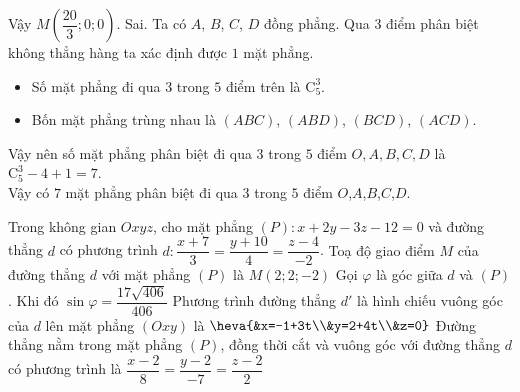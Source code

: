 \begin{ex}
{\begin{itemchoice}
			Vậy $M\left(\dfrac{20}{3};0;0\right)$.
			\itemch Sai. Ta có $A$, $B$, $C$, $D$ đồng phẳng. Qua $3$ điểm phân biệt không thẳng hàng ta xác định được $1$ mặt phẳng.
			\begin{itemize}
				\item Số mặt phẳng đi qua $3$ trong $5$ điểm trên là $\mathrm{C}_5^3$.
				\item Bốn mặt phẳng trùng nhau là $(ABC)$, $(ABD)$, $(BCD)$, $(ACD)$.
			\end{itemize}
			Vậy nên số mặt phẳng phân biệt đi qua $3$ trong $5$ điểm $O,A,B,C,D$ là $\mathrm{C}_5^3-4+1=7$.\\
			Vậy có $7$ mặt phẳng phân biệt đi qua $3$ trong $5$ điểm $O$,$A$,$B$,$C$,$D$.
		\end{itemchoice}
	}
\end{ex}
\begin{ex}%
		Trong không gian $Oxyz$, cho mặt phẳng $(P)\colon x+2y-3z-12=0$ và đường thẳng $d$ có phương trình $d\colon  \dfrac{x+7}{3}=\dfrac{y+10}{4}=\dfrac{z-4}{-2}$.
	\choiceTF
	{\True Toạ độ giao điểm $M$ của đường thẳng $d$ với mặt phẳng $(P)$ là $M(2;2;-2)$}
	{\True Gọi $\varphi $ là góc giữa $d$ và $(P)$. Khi đó $\sin \varphi=\dfrac{17\sqrt{406}}{406}$}
	{Phương trình đường thẳng $d'$ là hình chiếu vuông góc của $d$ lên mặt phẳng $\left(Oxy\right)$ là $\heva{&x=-1+3t\\&y=2+4t\\&z=0}$}
	{Đường thẳng nằm trong mặt phẳng $(P)$, đồng thời cắt và vuông góc với đường thẳng $d$ có phương trình là $\dfrac{x-2}{8}=\dfrac{y-2}{-7}=\dfrac{z-2}{2}$}
\end{ex}
